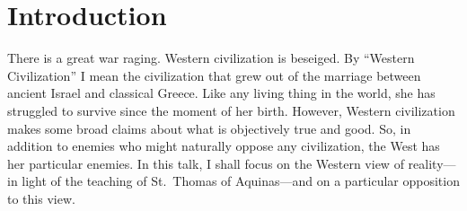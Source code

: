 \documentclass[twocolumn]{article}
\begin{document}
\thispagestyle{fancy}

\section{Introduction}

There is a great war raging.  Western civilization is beseiged.  By ``Western
Civilization'' I mean the civilization that grew out of the marriage between
ancient Israel and classical Greece.  Like any living thing in the world, she
has struggled to survive since the moment of her birth.  However, Western
civilization makes some broad claims about what is objectively true and good.
So, in addition to enemies who might naturally oppose any civilization, the
West has her particular enemies.  In this talk, I shall focus on the Western
view of reality---in light of the teaching of St.~Thomas of Aquinas---and on a
particular opposition to this view.
\end{document}
